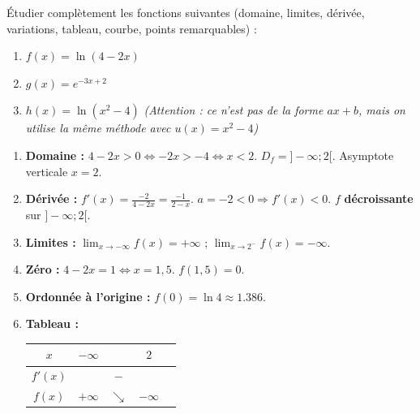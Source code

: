\documentclass[11pt]{article}
\begin{document}
\begin{exercice}
Étudier complètement les fonctions suivantes (domaine, limites, dérivée, variations, tableau, courbe, points remarquables) :
\begin{enumerate}
    \item $f(x) = \ln(4 - 2x)$
    \item $g(x) = e^{-3x+2}$
    \item $h(x) = \ln(x^2 - 4)$ \textit{(Attention : ce n'est pas de la forme $ax+b$, mais on utilise la même méthode avec $u(x)=x^2-4$)}
\end{enumerate}
\end{exercice}

\begin{corrige}[Exercice n°1 : $f(x) = ln(4-2x)$]
\begin{enumerate}
    \item \textbf{Domaine :} $4-2x > 0 \iff -2x > -4 \iff x < 2$. $D_f = ]-\infty; 2[$. Asymptote verticale $x=2$.
    \item \textbf{Dérivée :} $f'(x) = \frac{-2}{4-2x} = \frac{-1}{2-x}$. $a=-2<0 \Rightarrow f'(x)<0$. $f$ \textbf{décroissante} sur $]-\infty; 2[$.
    \item \textbf{Limites :} $\lim_{x\to -\infty} f(x) = +\infty$ ; $\lim_{x\to 2^-} f(x) = -\infty$.
    \item \textbf{Zéro :} $4-2x=1 \iff x=1,5$. $f(1,5)=0$.
    \item \textbf{Ordonnée à l'origine :} $f(0) = \ln 4 \approx \num{1,386}$.
    \item \textbf{Tableau :}
    \begin{center}
    \begin{tabular}{|c|cccc|}\hline
    $x$ & $-\infty$ & & $2$ & \\ \hline
    $f'(x)$ & & $-$ & & \\ \hline
    $f(x)$ & $+\infty$ & $\searrow$ & $-\infty$ & \\ \hline
    \end{tabular}
    \end{center}
\end{enumerate}
\end{corrige}
\end{document}
